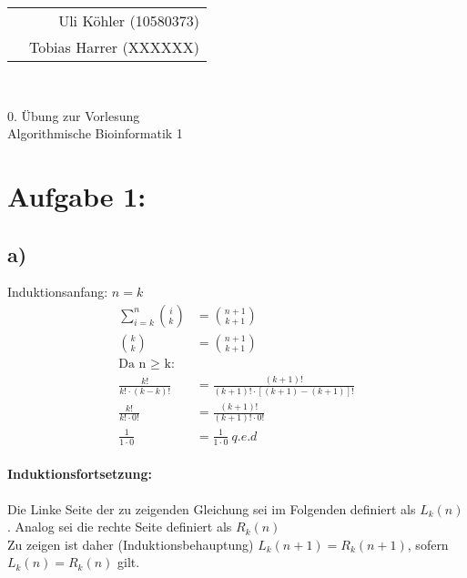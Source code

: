 \documentclass[a4paper,12pt,leqno]{scrartcl}
\begin{document}
{\scriptsize
\noindent\begin{tabular*}{\textwidth}{@{\extracolsep{\fill}}lr}
& Uli Köhler (10580373)\\
& Tobias Harrer (XXXXXX)
\end{tabular*}
}
\\
\begin{center}
\large 0. Übung zur Vorlesung\\
\Huge Algorithmische Bioinformatik 1
\end{center}\vspace{1cm}
\section*{Aufgabe 1:}
\subsection*{a)}
Induktionsanfang: $n = k$\\
\begin{align*}
\sum^n_{i=k} \binom{i}{k} &= \binom{n+1}{k+1}\\
\binom{k}{k} &= \binom{n+1}{k+1}\\
\text{Da n $\geq$ k:}\\
\frac{k!}{k!\cdot (k-k)!} &= \frac{(k+1)!}{(k+1)!\cdot [(k+1)-(k+1)]!}\\
\frac{k!}{k!\cdot 0!} &= \frac{(k+1)!}{(k+1)!\cdot 0!}\\
\frac{1}{1\cdot 0} &= \frac{1}{1\cdot 0}\ q.e.d
\end{align*}

\paragraph{Induktionsfortsetzung:}
Die Linke Seite der zu zeigenden Gleichung sei im Folgenden definiert als $L_k(n)$.
Analog sei die rechte Seite definiert als $R_k(n)$\\

Zu zeigen ist daher (Induktionsbehauptung) $L_k(n+1) = R_k(n+1)$, sofern $L_k(n) = R_k(n)$ gilt.
\end{document}
